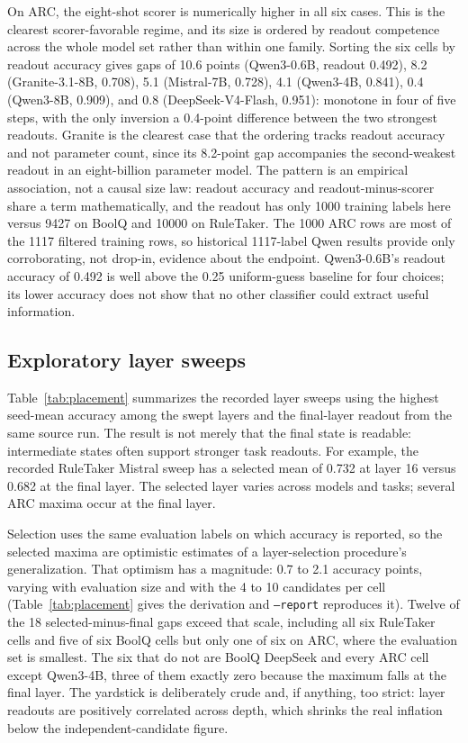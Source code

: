 On ARC, the eight-shot scorer is numerically higher in all six cases. This is
the clearest scorer-favorable regime, and its size is ordered by readout
competence across the whole model set rather than within one family. Sorting
the six cells by readout accuracy gives gaps of 10.6 points (Qwen3-0.6B,
readout 0.492), 8.2 (Granite-3.1-8B, 0.708), 5.1 (Mistral-7B, 0.728), 4.1
(Qwen3-4B, 0.841), 0.4 (Qwen3-8B, 0.909), and 0.8 (DeepSeek-V4-Flash,
0.951): monotone in four of five steps, with the only inversion a 0.4-point
difference between the two strongest readouts. Granite is the clearest case
that the ordering tracks readout accuracy and not parameter count, since its
8.2-point gap accompanies the second-weakest readout in an eight-billion
parameter model. The
pattern is an empirical association, not a causal size law: readout accuracy
and readout-minus-scorer share a term mathematically, and the readout has only
1000 training labels here versus 9427 on BoolQ and 10000 on RuleTaker. The
1000 ARC rows are most of the 1117 filtered training rows, so historical
1117-label Qwen results provide only corroborating, not drop-in, evidence
about the endpoint. Qwen3-0.6B's readout accuracy of 0.492 is well above the
0.25 uniform-guess baseline for four choices; its lower accuracy does not show
that no other classifier could extract useful information.



\subsection{Exploratory layer sweeps}
\label{sec:placement}

Table~\ref{tab:placement} summarizes the recorded layer sweeps using the
highest seed-mean accuracy among the swept layers and the final-layer
readout from the same source run. The result is not merely that the final
state is readable: intermediate states often support stronger task readouts.
For example, the recorded RuleTaker Mistral sweep has a selected mean of
0.732 at layer 16 versus 0.682 at the final layer. The selected layer varies
across models and tasks; several ARC maxima occur at the final layer.

Selection uses the same evaluation labels on which accuracy is reported, so
the selected maxima are optimistic estimates of a layer-selection procedure's
generalization. That optimism has a magnitude: 0.7 to 2.1 accuracy points,
varying with evaluation size and with the 4 to 10 candidates per cell
(Table~\ref{tab:placement} gives the derivation and
\texttt{--report} reproduces it). Twelve of the 18 selected-minus-final gaps
exceed that scale, including all six RuleTaker cells and five of six BoolQ
cells but only one of six on ARC, where the evaluation set is smallest. The
six that do not are BoolQ DeepSeek and every ARC cell except Qwen3-4B, three
of them exactly zero because the maximum falls at the final layer. The
yardstick is deliberately crude and, if anything, too strict: layer readouts
are positively correlated across depth, which shrinks the real inflation
below the independent-candidate figure.

